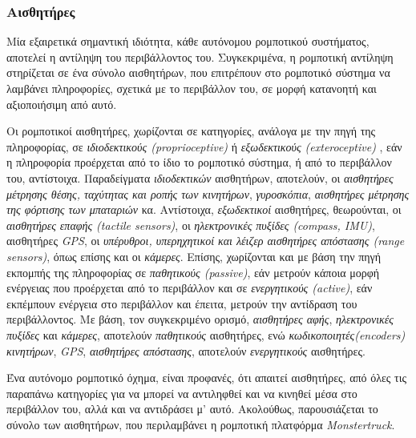 \bigskip
\subsubsection{Αισθητήρες} \label{sssec:sensors}
Μία εξαιρετικά σημαντική ιδιότητα, κάθε αυτόνομου ρομποτικού συστήματος, αποτελεί η αντίληψη του περιβάλλοντος του. Συγκεκριμένα, η ρομποτική αντίληψη στηρίζεται σε ένα σύνολο αισθητήρων, που επιτρέπουν στο ρομποτικό σύστημα να λαμβάνει πληροφορίες, σχετικά με το περιβάλλον του, σε μορφή κατανοητή και αξιοποιήσιμη από αυτό.

\bigskip
Οι ρομποτικοί αισθητήρες, χωρίζονται σε κατηγορίες, ανάλογα με την πηγή της πληροφορίας, σε \textit{ιδιοδεκτικούς (proprioceptive)} ή \textit{εξωδεκτικούς (exteroceptive)} \cite{autonomous_mobile_robots}, εάν η πληροφορία προέρχεται από το ίδιο το ρομποτικό σύστημα, ή από το περιβάλλον του, αντίστοιχα. Παραδείγματα \textit{ιδιοδεκτικών} αισθητήρων, αποτελούν, οι \textit{αισθητήρες μέτρησης θέσης, ταχύτητας και ροπής των κινητήρων}, \textit{γυροσκόπια}, \textit{αισθητήρες μέτρησης της φόρτισης των μπαταριών} κα. Αντίστοιχα, \textit{εξωδεκτικοί} αισθητήρες, θεωρούνται, οι \textit{αισθητήρες επαφής (tactile sensors)}, οι \textit{ηλεκτρονικές πυξίδες (compass, IMU)}, αισθητήρες \textit{GPS}, οι \textit{υπέρυθροι, υπερηχητικοί και λέιζερ αισθητήρες απόστασης (range sensors)}, όπως επίσης και οι \textit{κάμερες}. Επίσης, χωρίζονται και με βάση την πηγή εκπομπής της πληροφορίας \cite{autonomous_mobile_robots} σε \textit{παθητικούς (passive)}, εάν μετρούν κάποια μορφή ενέργειας που προέρχεται από το περιβάλλον και σε \textit{ενεργητικούς (active)}, εάν εκπέμπουν ενέργεια στο περιβάλλον και έπειτα, μετρούν την αντίδραση του περιβάλλοντος. Με βάση, τον συγκεκριμένο ορισμό, \textit{αισθητήρες αφής}, \textit{ηλεκτρονικές πυξίδες} και \textit{κάμερες}, αποτελούν \textit{παθητικούς} αισθητήρες, ενώ \textit{κωδικοποιητές(encoders) κινητήρων}, \textit{GPS}, \textit{αισθητήρες απόστασης}, αποτελούν \textit{ενεργητικούς} αισθητήρες. 

\bigskip
Ένα αυτόνομο ρομποτικό όχημα, είναι προφανές, ότι απαιτεί αισθητήρες, από όλες τις παραπάνω κατηγορίες για να μπορεί να αντιληφθεί και να κινηθεί μέσα στο περιβάλλον του, αλλά και να αντιδράσει μ' αυτό. Ακολούθως, παρουσιάζεται το σύνολο των αισθητήρων, που περιλαμβάνει η ρομποτική πλατφόρμα \textit{Monstertruck}.

